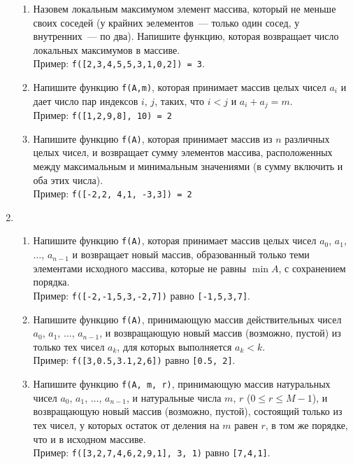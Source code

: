 \documentclass{article}
\begin{document}
\begin{enumerate}[label={}, leftmargin=0pt, itemindent=0pt]
\begin{enumerate}[label=\arabic{enumi}.\arabic*.]
\item 
Назовем локальным максимумом элемент массива, который не меньше своих соседей (у крайних эелементов~--- только один сосед, у внутренних~--- по два). Напишите функцию, которая возвращает число локальных максимумов в массиве.
\\Пример: \texttt{f([2,3,4,5,5,3,1,0,2]) = 3}.

\item Напишите функцию \texttt{f(A,m)}, которая принимает массив целых чисел $a_i$ и дает число пар индексов $i$, $j$, таких, что $i<j$ и $a_i + a_j=m$.
\\Пример: \texttt{f([1,2,9,8],\,10) = 2}

\item  
Напишите функцию \texttt{f(A)}, которая принимает массив из $n$ различных целых чисел, и возвращает сумму элементов массива, расположенных между максимальным и минимальным значениями (в сумму включить и оба этих числа).
\\Пример: \texttt{f([-2,2, 4,1, -3,3]) = 2}

\end{enumerate}



\hrulefill
\item
\begin{enumerate}[label=\arabic{enumi}.\arabic*.]
\item 
Напишите функцию \texttt{f(A)}, которая принимает массив целых чисел $a_0$, $a_1$, $\ldots$, $a_{n-1}$ и возвращает новый массив, образованный только теми элементами исходного массива, которые не равны $\min A$, с сохранением порядка.
\\Пример: \texttt{f([-2,-1,5,3,-2,7])} равно \texttt{[-1,5,3,7]}.

\item 
Напишите функцию \texttt{f(A)}, принимающую массив действительных чисел $a_0$, $a_1$, $\ldots$, $a_{n-1}$, и возвращающую новый массив (возможно, пустой) из только тех чисел $a_k$, для которых выполняется $a_k<k$.
\\Пример: \texttt{f([3,0.5,3.1,2,6])} равно \texttt{[0.5,\,2]}.

\item 
Напишите функцию \texttt{f(A, m, r)}, принимающую массив натуральных чисел $a_0$, $a_1$, $\ldots$, $a_{n-1}$, и натуральные числа $m$, $r$ ($0 \le r \le M-1$), и возвращающую новый массив (возможно, пустой), состоящий только из тех чисел, у которых остаток от деления на $m$ равен $r$, в том же порядке, что и в исходном массиве.
\\Пример: \texttt{f([3,2,7,4,6,2,9,1],\,3,\,1)} равно \texttt{[7,4,1]}.


\end{enumerate}
\end{enumerate}
\end{document}
